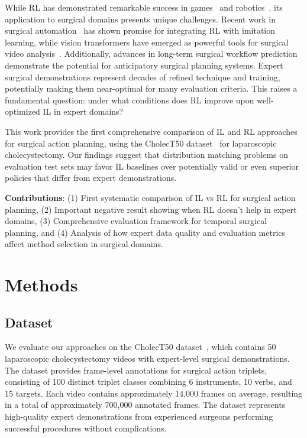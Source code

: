 \documentclass[runningheads]{llncs}
\begin{document}
While RL has demonstrated remarkable success in games~\cite{mnih2015human} and robotics~\cite{levine2016end}, its application to surgical domains presents unique challenges. Recent work in surgical automation~\cite{liu2024surgical} has shown promise for integrating RL with imitation learning, while vision transformers have emerged as powerful tools for surgical video analysis~\cite{wagner2023vision,liu2023skit,liu2025lovit}. Additionally, advances in long-term surgical workflow prediction~\cite{boels2025swag} demonstrate the potential for anticipatory surgical planning systems. Expert surgical demonstrations represent decades of refined technique and training, potentially making them near-optimal for many evaluation criteria. This raises a fundamental question: under what conditions does RL improve upon well-optimized IL in expert domains?

This work provides the first comprehensive comparison of IL and RL approaches for surgical action planning, using the CholecT50 dataset~\cite{nwoye2022cholect50} for laparoscopic cholecystectomy. Our findings suggest that distribution matching problems on evaluation test sets may favor IL baselines over potentially valid or even superior policies that differ from expert demonstrations.

\textbf{Contributions}: (1) First systematic comparison of IL vs RL for surgical action planning, (2) Important negative result showing when RL doesn't help in expert domains, (3) Comprehensive evaluation framework for temporal surgical planning, and (4) Analysis of how expert data quality and evaluation metrics affect method selection in surgical domains.

\section{Methods}

\subsection{Dataset}

We evaluate our approaches on the CholecT50 dataset~\cite{nwoye2022cholect50}, which contains 50 laparoscopic cholecystectomy videos with expert-level surgical demonstrations. The dataset provides frame-level annotations for surgical action triplets, consisting of 100 distinct triplet classes combining 6 instruments, 10 verbs, and 15 targets. Each video contains approximately 14,000 frames on average, resulting in a total of approximately 700,000 annotated frames. The dataset represents high-quality expert demonstrations from experienced surgeons performing successful procedures without complications.
\end{document}
